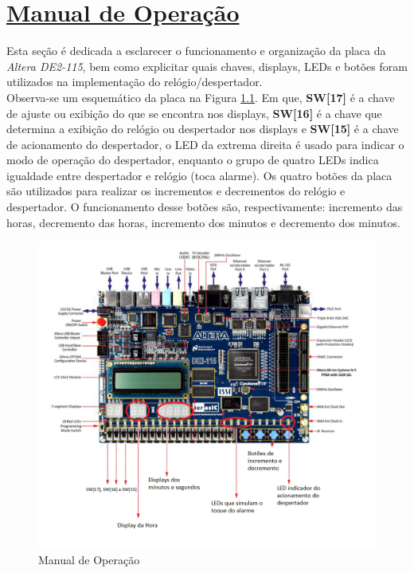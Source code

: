 \documentclass[14pt, oneside]{book}
\newcommand\tab[1][1cm]{\hspace*{#1}}
\theoremstyle{definition}
\begin{document}
         \chapter[Manual de Operação]{\hyperlink{toc}{Manual de Operação}}
                \tab Esta seção é dedicada a esclarecer o funcionamento e organização da placa da \textit{Altera DE2-115}, bem como explicitar quais chaves, displays, LEDs e botões foram utilizados na implementação do relógio/despertador. \\
                \tab Observa-se um esquemático da placa na Figura \ref{manual}. Em que, \textbf{SW[17]} é a chave de ajuste ou exibição do que se encontra nos displays, \textbf{SW[16]} é a chave que determina a exibição do relógio ou despertador nos displays e \textbf{SW[15]} é a chave de acionamento do despertador, o LED da extrema direita é usado para indicar o modo de operação do despertador, enquanto o grupo de quatro LEDs indica igualdade entre despertador e relógio (toca alarme). Os quatro botões da placa são utilizados para realizar os incrementos e decrementos do relógio e despertador. O funcionamento desse botões são, respectivamente: incremento das horas, decremento das horas, incremento dos minutos e decremento dos minutos. \\
                \begin{figure}[!h]
                    \centering
                    \includegraphics[scale=1]{manual.png}
                    \caption{Manual de Operação}
                    \label{manual}
                \end{figure}
                
\end{document}
